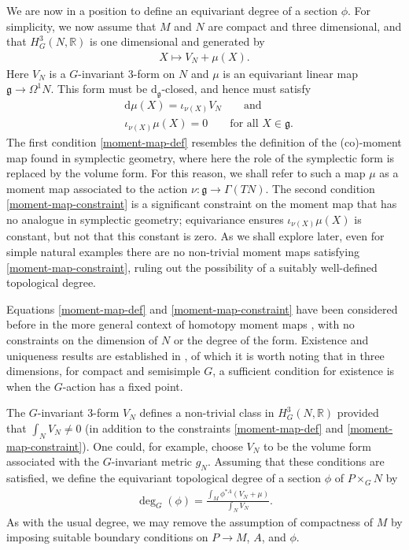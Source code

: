 \documentclass[pdftex]{sigma}
\newcommand{\g}{{\mathfrak{g}}}
\newcommand{\R}{{\mathbb{R}}}
\newcommand{\1}{{\mathbb{1}}}
\def \d{\mathrm{d}}
\numberwithin{equation}{section}
\begin{document}
We are now in a position to define an equivariant degree of a section $\phi$. For simplicity, we now assume that $M$ and $N$ are compact and three dimensional, and that $H^3_G(N,\R)$ is one dimensional and generated by
\begin{align*}
 X\mapsto V_N+\mu(X).
\end{align*}
Here $V_N$ is a $G$-invariant 3-form on $N$ and $\mu$ is an equivariant linear map $\g\to\Omega^1N$. This form must be $\d_\g$-closed, and hence must satisfy
\begin{align}\label{moment-map-def}
 & \d\mu(X)=\iota_{\nu(X)}V_N\qquad\text{and}\\
\label{moment-map-constraint}
 & \iota_{\nu(X)}\mu(X)=0\qquad\text{for all }X\in\g.
\end{align}
The first condition \eqref{moment-map-def} resembles the definition of the (co)-moment map found in symplectic geometry, where here the role of the symplectic form is replaced by the volume form. For this reason, we shall refer to such a map $\mu$ as a moment map associated to the action $\nu\colon \g\to\Gamma(TN)$.
The second condition \eqref{moment-map-constraint} is a significant constraint on the moment map that has no analogue in symplectic geometry; equivariance ensures $\iota_{\nu(X)}\mu(X)$ is constant, but not that this constant is zero. As we shall explore later, even for simple natural examples there are no non-trivial moment maps satisfying \eqref{moment-map-constraint}, ruling out the possibility of a suitably well-defined topological degree.

Equations \eqref{moment-map-def} and \eqref{moment-map-constraint} have been considered before in the more general context of homotopy moment maps \cite{calliesfregierrogerszambon2016homotopy}, with no constraints on the dimension of $N$ or the degree of the form. Existence and uniqueness results are established in \cite{calliesfregierrogerszambon2016homotopy}, of which it is worth noting that in three dimensions, for compact and semisimple $G$, a sufficient condition for existence is when the $G$-action has a fixed point.

The $G$-invariant 3-form $V_N$ defines a non-trivial class in $H^3_G(N,\R)$ provided that $\int_N V_N\neq0$ (in addition to the constraints \eqref{moment-map-def} and \eqref{moment-map-constraint}). One could, for example, choose $V_N$ to be the volume form associated with the $G$-invariant metric $g_N$. Assuming that these conditions are satisfied, we define the {equivariant topological degree} of a section $\phi$ of $P\times_GN$ by
\begin{align}\label{equivariant-top-degree}
 \deg_G(\phi)=\frac{\int_M\phi^{\ast A}(V_N+\mu)}{\int_N V_N}.
\end{align}
As with the usual degree, we may remove the assumption of compactness of $M$ by imposing suitable boundary conditions on $P\to M$, $A$, and $\phi$.
\end{document}
